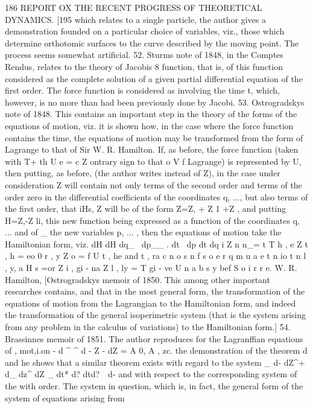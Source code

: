 \documentclass[11pt,a4paper]{book}
\begin{document}
186 REPORT OX THE RECENT PROGRESS OF THEORETICAL DYNAMICS.
[195
which relates to a single particle, the author gives a demonstration founded on a
particular choice of variables, viz., those which determine orthotomic surfaces to the
curve described by the moving point. The process seems somewhat artificial.
52. Sturms note of 1848, in the Comptes Rendus, relates to the theory of Jacobis
8 function, that is, of this function considered as the complete solution of a given
partial differential equation of the first order. The force function is considered as
involving the time t, which, however, is no more than had been previously done by
Jacobi.
53. Ostrogradskys note of 1848. This contains an important step in the theory
of the forms of the equations of motion, viz. it is shown how, in the case where the
force function contains the time, the equations of motion may be transformed from the
form of Lagrange to that of Sir W. R. Hamilton. If, as before, the force function
(taken with T+ th U e = c Z ontrary sign to that o V f Lagrange) is represented by U, then putting,
as before, (the author writes instead of Z), in the case under consideration
Z
will contain not only terms of the second order and terms of the order zero in the
differential coefficients of the coordinates q, ..., but also terms of the first order, that
iHs, Z will be of the form Z=Z, + Z 1 +Z , and putting H=Z,-Z li, this new function
being expressed as a function of the coordinates q, ... and of _ the new variables
p, ... , then the equations of motion take the Hamiltonian form, viz.
dH dH
dq_~ dp__
.
dt ~dp dt dq
i Z n n_= t T h , e Z t , h = eo 0 r , y Z o = f U t , he and t , ra c n o s n f s o e r q m u a e t n io t n l , y, a H s =or Z i , gi - na Z l , ly = T gi - ve U n a b s y bef S o i r r e. W. R. Hamilton,
[Ostrogradskys memoir of 1850. This among other important researches contains,
and that in the most general form, the transformation of the equations of motion
from the Lagrangian to the Hamiltonian form, and indeed the transformation of the
general isoperimetric system (that is the system arising from any problem in the
calculus of variations) to the Hamiltonian form.]
54. Brassinnes memoir of 1851. The author reproduces for the Lagranffian
equations of , mot,i.on - d ^ ^ d - Z - dZ = A 0, A , zc. the demonstration of the theorem
d
and he shows that a similar theorem exists with regard to the system
_ d- dZ^+ d_ dz^ dZ _
dt* d? dtd?~~d-
and with respect to the corresponding system of the with order. The system in
question, which is, in fact, the general form of the system of equations arising from
\end{document}
